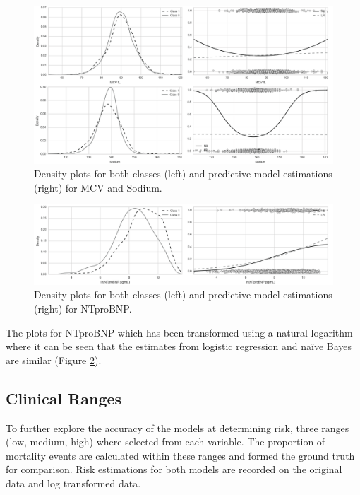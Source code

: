 \documentclass[a4paper,UKenglish]{oasics-v2016}
\begin{document}
\begin{figure}[h!]
\includegraphics[width=\textwidth]{MCV_Sodium.png}
\caption{Density plots for both classes (left) and predictive model estimations (right) for MCV and Sodium.}
\label{fig:sodium}
\end{figure}

\begin{figure}[h!]
\includegraphics[width=\textwidth]{NTproBNP-01.png}
\caption{Density plots for both classes (left) and predictive model estimations (right) for NTproBNP.}
\label{fig:ntprobnp}
\end{figure}

The plots for NTproBNP which has been transformed using a natural logarithm where it can be seen that the estimates from logistic regression and naïve Bayes are similar (Figure \ref{fig:ntprobnp}).



\subsection*{Clinical Ranges}

To further explore the accuracy of the models at determining risk, three ranges (low, medium, high) where selected from each variable. The proportion of mortality events are calculated within these ranges and formed the ground truth for comparison. Risk estimations for both models are recorded on the original data and log transformed data. 
\end{document}
